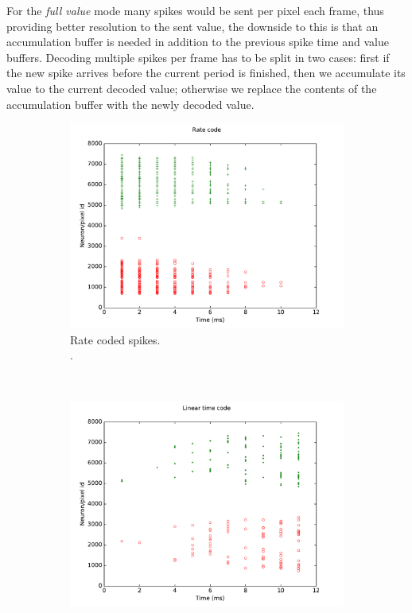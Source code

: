 \documentclass[twocolumn]{article}
\begin{document}
For the \textit{full value} mode many spikes would be sent per pixel each frame, thus providing better resolution to the sent value, the downside to this is that an accumulation buffer is needed in addition to the previous spike time and value buffers. Decoding multiple spikes per frame has to be split in two cases: first if the new spike arrives before the current period is finished, then we accumulate its value to the current decoded value; otherwise we replace the contents of the accumulation buffer with the newly decoded value.

\begin{figure}[htb]
  \captionsetup[subfigure]{justification=centering}
  
  \centering
  \begin{subfigure}[b]{0.25\textwidth}
    \includegraphics[width=\textwidth]{rate_code}
    \caption{Rate coded spikes.\\ .}
    \label{fig:rate_spikes}
  \end{subfigure}~
  \begin{subfigure}[b]{0.25\textwidth}
    \includegraphics[width=\textwidth]{time_code}

\end{subfigure}
\end{figure}
\end{document}

